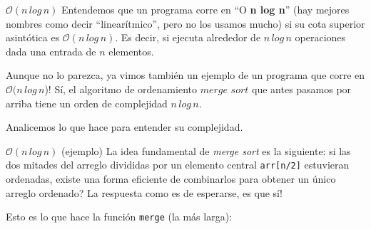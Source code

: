 \documentclass{beamer}
\begin{document}
    \begin{frame}{$\mathcal{O}(n \, log \, n)$}
        Entendemos que un programa corre en ``O \textbf{n log n}'' (hay mejores nombres como decir ``linearítmico'', pero no los usamos mucho) si su cota superior asintótica es $\mathcal{O}(n \, log \, n)$. Es decir, si ejecuta alrededor de $n \, log \, n$ operaciones dada una entrada de $n$ elementos. \pause \vspace{8pt}

        Aunque no lo parezca, ya vimos también un ejemplo de un programa que corre en $\mathcal{O}(n \, log \, n$)! \pause Sí, el algoritmo de ordenamiento $\textit{merge sort}$ que antes pasamos por arriba tiene un orden de complejidad $n \, log \, n$. \pause 

        Analicemos lo que hace para entender su complejidad.
    \end{frame}

    \begin{frame}{$\mathcal{O}(n \, log \, n)$ (ejemplo)}
        La idea fundamental de \textit{merge sort} es la siguiente: si las dos mitades del arreglo divididas por un elemento central \texttt{arr[n/2]} estuvieran ordenadas, existe una forma eficiente de combinarlos para obtener un único arreglo ordenado? \pause La respuesta como es de esperarse, es que sí! \pause \vspace{8pt}

        Esto es lo que hace la función \texttt{merge} (la más larga):
    \end{frame}
\end{document}
